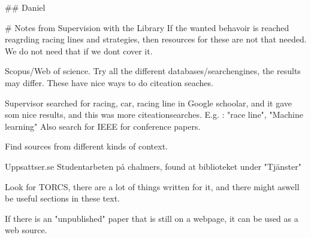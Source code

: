 ## Daniel



# Notes from Supervision with the Library
If the wanted behavoir is reached reagrding racing lines and strategies, then resources for these are not that needed. We do not need that if we dont cover it.

Scopus/Web of science. Try all the different databases/searchengines, the results may differ.
These have nice ways to do citeation seaches.

Supervisor searched for racing, car, racing line in Google schoolar, and it gave som nice results, and this was more citeationsearches. E.g. : "race line", "Machine learning"
Also search for IEEE for conference papers.

Find sources from different kinds of context.

Uppsattser.se
Studentarbeten på chalmers, found at biblioteket under "Tjänster"

Look for TORCS, there are a lot of things written for it, and there might aswell be useful sections in these text.

If there is an "unpublished" paper that is still on a webpage, it can be used as a web source. 
